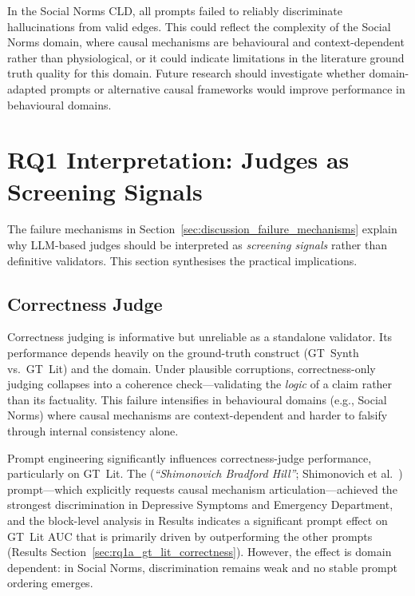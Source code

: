 In the Social Norms CLD, all prompts failed to reliably discriminate hallucinations from valid edges. This could reflect the complexity of the Social Norms domain, where causal mechanisms are behavioural and context-dependent rather than physiological, or it could indicate limitations in the literature ground truth quality for this domain. Future research should investigate whether domain-adapted prompts or alternative causal frameworks would improve performance in behavioural domains.

\section{RQ1 Interpretation: Judges as Screening Signals}
\label{sec:discussion_rq1a_correctness}
\label{sec:discussion_rq1a_citation}
\label{sec:discussion_judge_human_agreement}
The failure mechanisms in Section~\ref{sec:discussion_failure_mechanisms} explain why LLM-based judges should be interpreted as \emph{screening signals} rather than definitive validators. This section synthesises the practical implications.

\subsection{Correctness Judge}
Correctness judging is informative but unreliable as a standalone validator. Its performance depends heavily on the ground-truth construct (GT~Synth vs.\ GT~Lit) and the domain. Under plausible corruptions, correctness-only judging collapses into a coherence check---validating the \emph{logic} of a claim rather than its factuality. This failure intensifies in behavioural domains (e.g., Social Norms) where causal mechanisms are context-dependent and harder to falsify through internal consistency alone.

Prompt engineering significantly influences correctness-judge performance, particularly on GT~Lit. The \PromptMechanistic{} (\emph{``Shimonovich Bradford Hill''}; Shimonovich et al.~\citep{shimonovich2020bradford}) prompt---which explicitly requests causal mechanism articulation---achieved the strongest discrimination in Depressive Symptoms and Emergency Department, and the block-level analysis in Results indicates a significant prompt effect on GT~Lit AUC that is primarily driven by \PromptMechanistic{} outperforming the other prompts (Results Section~\ref{sec:rq1a_gt_lit_correctness}). However, the effect is domain dependent: in Social Norms, discrimination remains weak and no stable prompt ordering emerges.

